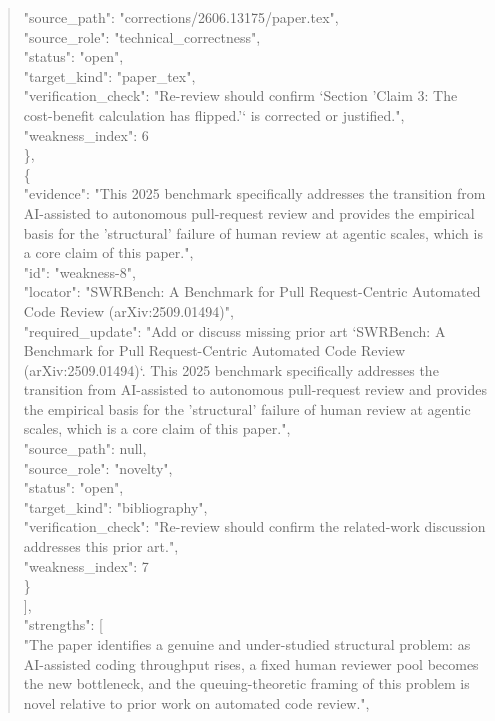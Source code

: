 \documentclass[11pt]{article}
\begin{document}
\begin{quote}
      "source\_path": "corrections/2606.13175/paper.tex",\\
      "source\_role": "technical\_correctness",\\
      "status": "open",\\
      "target\_kind": "paper\_tex",\\
      "verification\_check": "Re-review should confirm `Section 'Claim 3: The cost-benefit calculation has flipped.'` is corrected or justified.",\\
      "weakness\_index": 6\\
    \},\\
    \{\\
      "evidence": "This 2025 benchmark specifically addresses the transition from AI-assisted to autonomous pull-request review and provides the empirical basis for the 'structural' failure of human review at agentic scales, which is a core claim of this paper.",\\
      "id": "weakness-8",\\
      "locator": "SWRBench: A Benchmark for Pull Request-Centric Automated Code Review (arXiv:2509.01494)",\\
      "required\_update": "Add or discuss missing prior art `SWRBench: A Benchmark for Pull Request-Centric Automated Code Review (arXiv:2509.01494)`. This 2025 benchmark specifically addresses the transition from AI-assisted to autonomous pull-request review and provides the empirical basis for the 'structural' failure of human review at agentic scales, which is a core claim of this paper.",\\
      "source\_path": null,\\
      "source\_role": "novelty",\\
      "status": "open",\\
      "target\_kind": "bibliography",\\
      "verification\_check": "Re-review should confirm the related-work discussion addresses this prior art.",\\
      "weakness\_index": 7\\
    \}\\
  ],\\
  "strengths": [\\
    "The paper identifies a genuine and under-studied structural problem: as AI-assisted coding throughput rises, a fixed human reviewer pool becomes the new bottleneck, and the queuing-theoretic framing of this problem is novel relative to prior work on automated code review.",\\

\end{quote}
\end{document}
